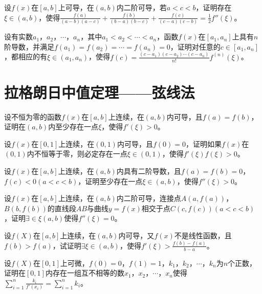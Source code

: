 \begin{example}
	设$f(x)$在$[a,b]$上可导，在$(a,b)$内二阶可导，若$a<c<b$，证明存在$\xi\in(a,b)$，使得$\frac{f(a)}{(a-b)(a-c)}+\frac{f(b)}{(b-a)(b-c)}+\frac{f(c)}{(c-a)(c-b)}=\frac{1}{2}f''(\xi)$。
\end{example}

\begin{example}
	设有实数$a_1$，$a_2$，$\cdots$，$a_n$，其中$a_1<a_2<\cdots<a_n$，函数$f(x)$在$[a_1,a_n]$上具有$n$阶导数，并满足$f(a_1)=f(a_2)=\cdots=f(a_n)=0$，证明对任意的$c\in[a_1,a_n]$，都相应的有$\xi\in(a_1,a_n)$，使得$f(c)=\frac{(c-a_1)(c-a_2)\cdots(c-a_n)}{n!}f^{(n)}(\xi)$。
\end{example}

\section{拉格朗日中值定理——弦线法}
\begin{example}
	设不恒为零的函数$f(x)$在$[a,b]$上连续，在$(a,b)$内可导，且$f(a)=f(b)$，证明在$(a,b)$内至少存在一点$\xi$，使得$f'(\xi)>0$。
\end{example}

\begin{example}
	设$f(x)$在$[0,1]$上连续，在$(0,1)$内可导，且$f(0)=0$，证明如果$f(x)$在$(0,1)$内不恒等于零，则必定存在一点$\xi\in(0,1)$，使得$f'(\xi)f(\xi)>0$。
\end{example}

\begin{example}
	设$f(x)$在$[a,b]$上连续，在$(a,b)$内具有二阶导数，且$f(a)=f(b)=0$，$f(c)<0(a<c<b)$，证明至少存在一点$\xi\in(a,b)$，使得$f''(\xi)>0$。
\end{example}

\begin{example}
	设$f(x)$在$[a,b]$上连续，在$(a,b)$内二阶可导，连接点$A(a,f(a))$，$B(b,f(b))$的直线段$AB$与曲线$y=f(x)$相交于点$C(c,f(c))(a<c<b)$，证明$\exists\in\xi(a,b)$使得$f''(\xi)=0$。
\end{example}

\begin{example}
	设$f(X)$在$[a,b]$上连续，在$(a,b)$内可导，又$f(x)$不是线性函数，且$f(b)>f(a)$，试证明$\exists\xi\in(a,b)$，使得$f'(\xi)>\frac{f(b)-f(a)}{b-a}$。
\end{example}

\begin{example}
	\color{red}设$f(X)$在$[0,1]$上可微，$f(0)=0$，$f(1)=1$，$k_1$，$k_2$，$\cdots$，$k_n$为$n$个正数，证明在$[0,1]$内存在一组互不相等的数$x_1$，$x_2$，$\cdots$，$x_n$使得$\sum_{i=1}^n\frac{k_i}{f'(x_i)}=\sum_{i=1}^nk_i$\color{black}。
\end{example}

